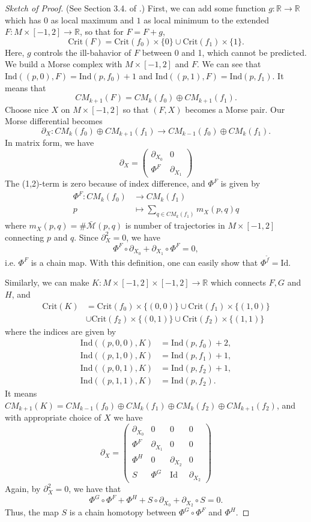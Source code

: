 \documentclass{article}
\newcommand{\R}{\mathbb{R}}
\newcommand{\pp}{\partial}
\newcommand{\M}{\mathcal{M}}
\newcommand{\Crit}{\mathrm{Crit}}
\newcommand{\Ind}{\mathrm{Ind}}
\newcommand{\Id}{\mathrm{Id}}
\begin{document}
\begin{proof}[Sketch of Proof]
(See Section 3.4. of \cite{ad}.)
First, we can add some function $g:\R\to\R$ which has $0$ as local maximum and $1$ as local minimum to the extended $F:M\times[-1,2]\to\R$, so that for $F=F+g$,
	$$\Crit(F)=\Crit(f_0)\times\{0\}\cup\Crit(f_1)\times\{1\}.$$
Here, $g$ controls the ill-bahavior of $F$ between 0 and 1, which cannot be predicted.
We build a Morse complex with $M\times[-1,2]$ and $F$.
We can see that $\Ind((p,0),F)=\Ind(p,f_0)+1$ and $\Ind((p,1),F)=\Ind(p,f_1)$.
It means that 
	$$CM_{k+1}(F)=CM_k(f_0)\oplus CM_{k+1}(f_1).$$
Choose nice $X$ on $M\times[-1,2]$ so that $(F,X)$ becomes a Morse pair.
Our Morse differential becomes
	$$\pp_X:CM_k(f_0)\oplus CM_{k+1}(f_1)\to CM_{k-1}(f_0)\oplus CM_k(f_1).$$
In matrix form, we have
	$$\pp_X=\left(\begin{array}{cc}
		\pp_{X_0}&	0\\
		\Phi^F&	\pp_{X_1}
		\end{array}\right)$$
The (1,2)-term is zero because of index difference, and $\Phi^F$ is given by
	$$\begin{aligned}
	\Phi^F:CM_k(f_0)&\to CM_k(f_1)\\
		p&\mapsto \sum_{q\in CM_k(f_1)}m_X(p,q)q
		\end{aligned}$$
where $m_X(p,q)=\#\bar{\M}(p,q)$ is number of trajectories in $M\times[-1,2]$ connecting $p$ and $q$.
Since $\pp_X^2=0$, we have
	$$\Phi^F\circ\pp_{X_0}+\pp_{X_1}\circ\Phi^F=0,$$
i.e. $\Phi^F$ is a chain map.
With this definition, one can easily show that $\Phi^{\tilde{f}}=\Id$.

Similarly, we can make $K:M\times[-1,2]\times[-1,2]\to\R$ which connects $F,G$ and $H$, and
	$$\begin{aligned}
	\Crit(K)&=\Crit(f_0)\times\{(0,0)\}\cup\Crit(f_1)\times\{(1,0)\}\\
			&\cup\Crit(f_2)\times\{(0,1)\}\cup\Crit(f_2)\times\{(1,1)\}
			\end{aligned}$$
where the indices are given by
	$$\begin{aligned}
	\Ind((p,0,0),K)&=\Ind(p,f_0)+2,\\
	\Ind((p,1,0),K)&=\Ind(p,f_1)+1,\\
	\Ind((p,0,1),K)&=\Ind(p,f_2)+1,\\
	\Ind((p,1,1),K)&=\Ind(p,f_2).
	\end{aligned}$$
It means $CM_{k+1}(K)=CM_{k-1}(f_0)\oplus CM_k(f_1)\oplus CM_k(f_2)\oplus CM_{k+1}(f_2)$, and with appropriate choice of $X$ we have
	$$\pp_X=\left(\begin{array}{cccc}
		\pp_{X_0}&0&0&0\\
		\Phi^F&\pp_{X_1}&0&0\\
		\Phi^H&0&\pp_{X_2}&0\\
		S&\Phi^G&\Id&\pp_{X_2}
		\end{array}\right)$$
Again, by $\pp_X^2=0$, we have that
	$$\Phi^G\circ\Phi^F+\Phi^H+S\circ\pp_{X_0}+\pp_{X_2}\circ S=0.$$
Thus, the map $S$ is a chain homotopy between $\Phi^G\circ\Phi^F$ and $\Phi^H$.
\end{proof}
\end{document}
